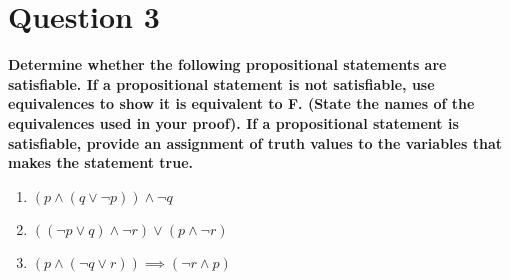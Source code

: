 \documentclass[11pt]{article}
\begin{document}
\clearpage
\section*{Question 3}
    \textbf{ Determine whether the following propositional statements are satisfiable. If a propositional statement is not satisfiable, use equivalences to show it is equivalent to F. (State the names of the equivalences used in your proof). If a propositional statement is satisfiable, provide an assignment of truth values to the variables that makes the statement true.}
    \begin{enumerate}[label=(\alph*)]
        \item \((p \land (q \lor \neg p)) \land \neg q\)
        \item \(((\neg p \lor q) \land \neg r) \lor (p \land \neg r)\)
        \item \((p \land (\neg q \lor r)) \implies (\neg r \land p)\)
    \end{enumerate}
\end{document}
